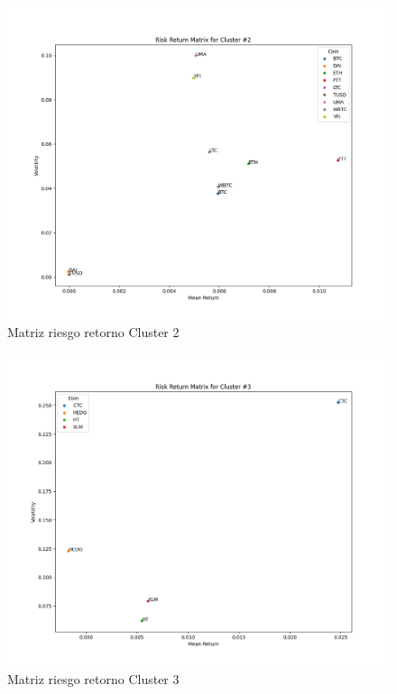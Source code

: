 \documentclass[runningheads,legalpaper,10pt]{etc/llncs}
\begin{document}
\begin{figure}[htp]
    \centering
    \includegraphics[scale=0.5]{images/cluster_2.png}
    \caption{Matriz riesgo retorno Cluster 2}
    \label{fig:cluster_2}
\end{figure}

\begin{figure}[htp]
    \centering
    \includegraphics[scale=0.5]{images/cluster_3.png}
    \caption{Matriz riesgo retorno Cluster 3}
    \label{fig:cluster_3}
\end{figure}
\end{document}
